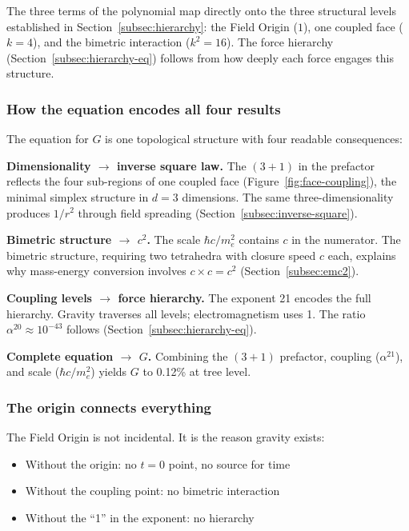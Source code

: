 \documentclass[aps,prd,preprint,superscriptaddress,showpacs,preprintnumbers,amsmath,amssymb,nofootinbib]{revtex4-2}
\begin{document}
The three terms of the polynomial map directly onto the three structural levels established in Section~\ref{subsec:hierarchy}: the Field Origin ($1$), one coupled face ($k = 4$), and the bimetric interaction ($k^2 = 16$). The force hierarchy (Section~\ref{subsec:hierarchy-eq}) follows from how deeply each force engages this structure.

\subsubsection*{How the equation encodes all four results}

The equation for $G$ is one topological structure with four readable consequences:

\textbf{Dimensionality $\rightarrow$ inverse square law.} The $(3+1)$ in the prefactor reflects the four sub-regions of one coupled face (Figure~\ref{fig:face-coupling}), the minimal simplex structure in $d = 3$ dimensions. The same three-dimensionality produces $1/r^2$ through field spreading (Section~\ref{subsec:inverse-square}).

\textbf{Bimetric structure $\rightarrow$ $c^2$.} The scale $\hbar c/m_e^2$ contains $c$ in the numerator. The bimetric structure, requiring two tetrahedra with closure speed $c$ each, explains why mass-energy conversion involves $c \times c = c^2$ (Section~\ref{subsec:emc2}).

\textbf{Coupling levels $\rightarrow$ force hierarchy.} The exponent 21 encodes the full hierarchy. Gravity traverses all levels; electromagnetism uses 1. The ratio $\alpha^{20} \approx 10^{-43}$ follows (Section~\ref{subsec:hierarchy-eq}).

\textbf{Complete equation $\rightarrow$ $G$.} Combining the $(3+1)$ prefactor, coupling ($\alpha^{21}$), and scale ($\hbar c/m_e^2$) yields $G$ to 0.12\% at tree level.

\subsubsection*{The origin connects everything}

The Field Origin is not incidental. It is the reason gravity exists:
\begin{itemize}
\item Without the origin: no $t = 0$ point, no source for time
\item Without the coupling point: no bimetric interaction
\item Without the ``1'' in the exponent: no hierarchy
\end{itemize}
\end{document}
